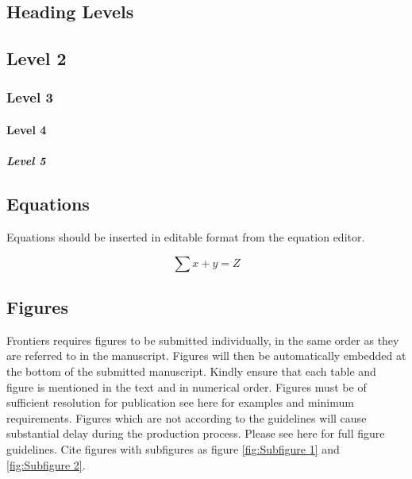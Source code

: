 \documentclass[utf8]{FrontiersinHarvard} %
\providecommand{\href}[2]{#2}
\renewcommand*{\|}[1][]{\nonscript\:#1\vert\nonscript\:\mathopen{}}
\begin{document}
\subsection{Heading Levels}


\subsection{Level 2}
\subsubsection{Level 3}
\paragraph{Level 4}
\subparagraph{Level 5}

\subsection{Equations}
Equations should be inserted in editable format from the equation editor.

\begin{equation}
\sum x+ y =Z\label{eq:01}
\end{equation}

\subsection{Figures}
Frontiers requires figures to be submitted individually, in the same order as they are referred to in the manuscript. Figures will then be automatically embedded at the bottom of the submitted manuscript. Kindly ensure that each table and figure is mentioned in the text and in numerical order. Figures must be of sufficient resolution for publication \href{https://www.frontiersin.org/about/author-guidelines#ImageSizeRequirements}{see here for examples and minimum requirements}. Figures which are not according to the guidelines will cause substantial delay during the production process. Please see \href{https://www.frontiersin.org/about/author-guidelines#FigureRequirementsStyleGuidelines}{here} for full figure guidelines. Cite figures with subfigures as figure \ref{fig:Subfigure 1} and \ref{fig:Subfigure 2}.
\end{document}
